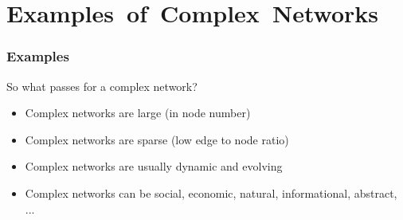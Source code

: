 
\section{Examples\ of\ Complex\ Networks}

\begin{frame}
  \frametitle{Examples}

  \begin{block}{So what passes for a complex network?}
    \begin{itemize}
    \item<2-> Complex networks are \alert{large} (in node number)
    \item<3-> Complex networks are \alert{sparse} (low edge to node ratio)
    \item<4-> Complex networks are usually \alert{dynamic} and \alert{evolving}
    \item<5-> Complex networks can be social, economic, natural, informational, abstract, ...
    \end{itemize}
  \end{block}

\end{frame}

